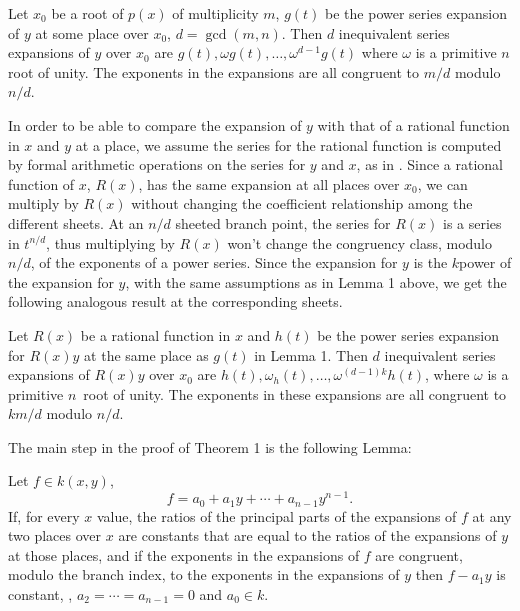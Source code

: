 \begin{lemma}
Let $x_0$ be a root of $p(x)$ of multiplicity $m$, $g(t)$ be the power
series expansion of $y$ at some place over $x_0$, $d=\gcd(m,n)$.  Then
$d$ inequivalent series expansions of $y$ over $x_0$ are $g(t), \omega
g(t), \ldots, \omega^{d-1}g(t)$ where $\omega$ is a primitive $n$\th
root of unity.  The exponents in the expansions are all congruent to
$m/d$ modulo $n/d$.
\end{lemma}

In order to be able to compare the expansion of $y$ with that of a
rational function in $x$ and $y$ at a place, we assume the series for
the rational function is computed by formal arithmetic operations on
the series for $y$ and $x$, as in \cite{Zippel1976-yk}.  Since a
rational function of $x$, $R(x)$, has the same expansion at all places
over $x_0$, we can multiply by $R(x)$ without changing the coefficient
relationship among the different sheets.  At an $n/d$ sheeted branch
point, the series for $R(x)$ is a series in $t^{n/d}$, thus
multiplying by $R(x)$ won't change the congruency class, modulo $n/d$,
of the exponents of a power series.  Since the expansion for $y$ is
the $k$\th power of the expansion for $y$, with the same assumptions
as in Lemma 1 above, we get the following analogous result at the
corresponding sheets.

\begin{lemma}
Let $R(x)$ be a rational function in $x$ and $h(t)$ be
the power series expansion for $R(x)y$ at the same place as $g(t)$ in
Lemma 1.  Then $d$ inequivalent series expansions of $R(x)y$ over $x_0$ are
$h(t), \omega_ h(t), \ldots, \omega^{(d-1)k}h(t)$, where
$\omega$ is a primitive $n$\th\ root of unity.  The exponents in
these expansions are all congruent to $km/d$ modulo $n/d$.
\end{lemma}
	
The main step in the proof of Theorem 1 is the following Lemma:

\begin{lemma}
Let $f \in k(x,y)$, 
\[
f = a_0 + a_1 y + \cdots + a_{n-1}y^{n-1}.
\]
If, for every $x$ value, the ratios of the principal parts of the
expansions of $f$ at any two places over $x$ are constants that are
equal to the ratios of the expansions of $y$ at those places, and if
the exponents in the expansions of $f$ are congruent, modulo the
branch index, to the exponents in the expansions of $y$ then $f-a_1 y$
is constant, \ie, $a_2= \cdots =a_{n-1}=0$ and $a_0 \in k$.
\end{lemma}

